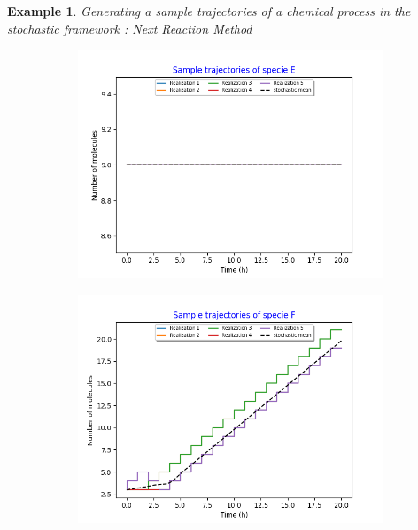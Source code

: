 \documentclass[11pt,a4paper]{article}
\newtheorem{example}[theorem]{Example}
\begin{document}
\begin{example}{Generating a sample trajectories of a chemical process in the stochastic framework : Next Reaction Method}
\begin{figure}[H]
\begin{subfigure}{.5\textwidth}
        \includegraphics[width=1.1\linewidth]{Images/e.png}
        \label{fig: Single sample trajectory}
    \end{subfigure}%
    \begin{subfigure}{.5\textwidth}
      \centering
        \includegraphics[width=1.1\linewidth]{Images/f.png}
        \label{fig: Single sample trajectory}
    \end{subfigure}
    \centering
    \begin{subfigure}{.5\textwidth}
      \centering

\end{subfigure}
\end{figure}
\end{example}
\end{document}
